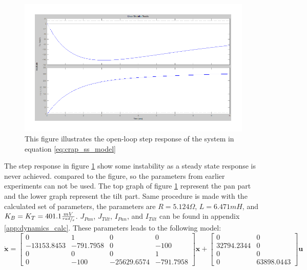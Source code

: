 \begin{figure}[htb]
	\begin{center}
	\includegraphics[scale=1,trim=0 0 0 0]{graphics/CrapSim.pdf} %
	\caption{This figure illustrates the open-loop step response of the system in equation \ref{eq:crap_ss_model}}
	\label{fig:crap_step}			%
	\end{center}
\end{figure}
The step response in figure \ref{fig:crap_step} show some instability as a steady state response is never achieved.  compared to the figure, so the parameters from earlier experiments can not be used. The top graph of figure \ref{fig:crap_step} represent the pan part and the lower graph represent the tilt part. Same procedure is made with the calculated set of parameters, the parameters are $R = 5.124\Omega$, $L = 6.471mH$, and $K_B = K_T = 401.1 \frac{mV}{\sfrac{rad}{s}}$. $J_{Pan}$, $J_{Tilt}$, $I_{Pan}$, and $I_{Tilt}$ can be found in appendix \ref{app:dynamics_calc}.
These parameters leads to the following model:
\begin{equation}
 \dot{\textbf{x}} =
 \begin{bmatrix}
   0 & 1 & 0 & 0\\
   - 13153.8453 & - 791.7958 & 0 & - 100\\
   0 & 0 & 0 & 1\\
   0 & - 100 & - 25629.6574 & - 791.7958
 \end{bmatrix}
 \textbf{x} +
 \begin{bmatrix}
   0 & 0\\
   32794.2344 & 0\\
   0 & 0\\
   0 & 63898.0443
 \end{bmatrix}
 \textbf{u}\label{eq:super_ss_model}
\end{equation}
